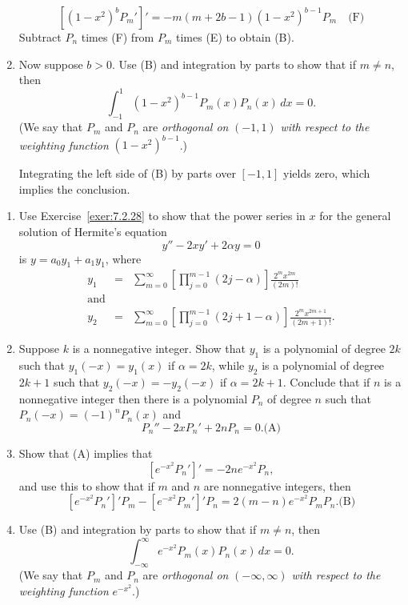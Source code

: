 \documentclass{ximera}
\begin{document}
\begin{problem}
\begin{enumerate}
\begin{solution}
   $$
[(1-x^2)^b P_m']'=-m(m+2b-1)(1-x^2)^{b-1}P_m \quad
\text{(F)}
$$
Subtract  $P_n$ times (F) from $P_m$ times (E) to obtain (B).
\end{solution}

\item %
Now suppose $b>0$.
Use (B) and integration by parts to show that
if $m\ne n$, then
$$
\int_{-1}^1 (1-x^2)^{b-1}P_m(x)P_n(x)\,dx=0.
$$
(We say  that $P_m$ and $P_n$ are \emph{orthogonal on}
$(-1,1)$ \emph{with respect to the weighting
function} $(1-x^2)^{b-1}$.)

\begin{solution}
    Integrating the left side of (B) by parts over $[-1,1]$
yields zero, which implies the conclusion.
\end{solution}
\end{enumerate}
\end{problem}

\begin{problem}\label{exer:7.2.31}
\begin{enumerate}
\item %
Use Exercise~\ref{exer:7.2.28}  to show that the power series in $x$
for the general solution
 of Hermite's equation
$$
y''-2xy'+2\alpha y=0
$$
is $y=a_0y_1+a_1y_1$, where
\begin{eqnarray*}
y_1&=&\sum_{m=0}^\infty \left[\prod_{j=0}^{m-1}(2j-\alpha)
\right]\frac{2^mx^{2m}}{(2m)!}\\
\mbox{and}\\
y_2&=&\sum_{m=0}^\infty \left[\prod_{j=0}^{m-1}(2j+1-\alpha)
\right]\frac{2^mx^{2m+1}}{(2m+1)!}.
\end{eqnarray*}
\item %
Suppose $k$ is a nonnegative integer. Show that $y_1$ is a
polynomial of degree $2k$ such that $y_1(-x)=y_1(x)$ if $\alpha=2k$,
while $y_2$ is a polynomial of degree $2k+1$ such that
$y_2(-x)=-y_2(-x)$ if $\alpha=2k+1$. Conclude that if $n$ is a
nonnegative integer then there is a polynomial $P_n$ of degree $n$
such that $P_n(-x)=(-1)^nP_n(x)$ and
$$
P_n''-2xP_n'+2nP_n=0.
\text{(A)}
$$
\item %
Show that (A) implies that
$$
[e^{-x^2}P_n']'=-2ne^{-x^2}P_n,
$$
and use this to show that if $m$ and $n$ are nonnegative integers, then
$$
[e^{-x^2}P_n']'P_m-[e^{-x^2}P_m']'P_n=
2(m-n)e^{-x^2}P_mP_n.
\text{(B)}
$$
\item %
Use (B) and integration by parts to show that
if $m\ne n$, then
$$
\int_{-\infty}^\infty e^{-x^2}P_m(x)P_n(x)\,dx=0.
$$
(We say  that $P_m$ and $P_n$ are \emph{orthogonal on}
$(-\infty,\infty)$ \emph{ with respect to the weighting function}
$e^{-x^2}$.)
\end{enumerate}
\end{problem}
\end{document}
